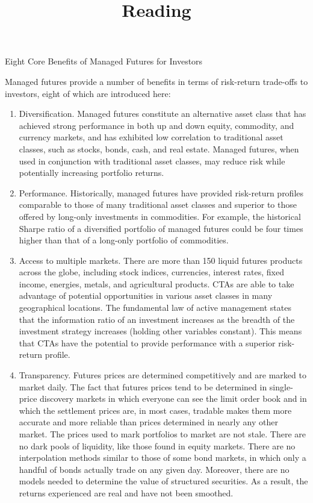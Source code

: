 \documentclass[11pt]{article}
\title{Reading }
\author{}
\date{}
\begin{document}
\maketitle
Eight Core Benefits of Managed Futures for Investors

Managed futures provide a number of benefits in terms of risk-return trade-offs to investors, eight of which are introduced here:

\begin{enumerate}
  \item Diversification. Managed futures constitute an alternative asset class that has achieved strong performance in both up and down equity, commodity, and currency markets, and has exhibited low correlation to traditional asset classes, such as stocks, bonds, cash, and real estate. Managed futures, when used in conjunction with traditional asset classes, may reduce risk while potentially increasing portfolio returns.

  \item Performance. Historically, managed futures have provided risk-return profiles comparable to those of many traditional asset classes and superior to those offered by long-only investments in commodities. For example, the historical Sharpe ratio of a diversified portfolio of managed futures could be four times higher than that of a long-only portfolio of commodities.

  \item Access to multiple markets. There are more than 150 liquid futures products across the globe, including stock indices, currencies, interest rates, fixed income, energies, metals, and agricultural products. CTAs are able to take advantage of potential opportunities in various asset classes in many geographical locations. The fundamental law of active management states that the information ratio of an investment increases as the breadth of the investment strategy increases (holding other variables constant). This means that CTAs have the potential to provide performance with a superior risk-return profile.

  \item Transparency. Futures prices are determined competitively and are marked to market daily. The fact that futures prices tend to be determined in single-price discovery markets in which everyone can see the limit order book and in which the settlement prices are, in most cases, tradable makes them more accurate and more reliable than prices determined in nearly any other market. The prices used to mark portfolios to market are not stale. There are no dark pools of liquidity, like those found in equity markets. There are no interpolation methods similar to those of some bond markets, in which only a handful of bonds actually trade on any given day. Moreover, there are no models needed to determine the value of structured securities. As a result, the returns experienced are real and have not been smoothed.


\end{enumerate}
\end{document}
